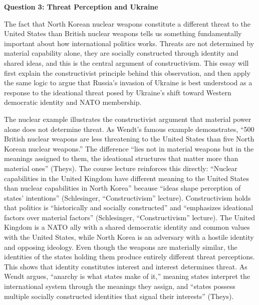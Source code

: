 \documentclass[12pt]{article}
\begin{document}
\newpage
\noindent \textbf{Question 3: Threat Perception and Ukraine}

The fact that North Korean nuclear weapons constitute a different threat to the United States than British nuclear weapons tells us something fundamentally important about how international politics works. Threats are not determined by material capability alone, they are socially constructed through identity and shared ideas, and this is the central argument of constructivism. This essay will first explain the constructivist principle behind this observation, and then apply the same logic to argue that Russia's invasion of Ukraine is best understood as a response to the ideational threat posed by Ukraine's shift toward Western democratic identity and NATO membership.

The nuclear example illustrates the constructivist argument that material power alone does not determine threat. As Wendt's famous example demonstrates, ``500 British nuclear weapons are less threatening to the United States than five North Korean nuclear weapons.'' The difference ``lies not in material weapons but in the meanings assigned to them, the ideational structures that matter more than material ones'' (Theys). The course lecture reinforces this directly: ``Nuclear capabilities in the United Kingdom have different meaning to the United States than nuclear capabilities in North Korea'' because ``ideas shape perception of states' intentions'' (Schlesinger, ``Constructivism'' lecture). Constructivism holds that politics is ``historically and socially constructed'' and ``emphasizes ideational factors over material factors'' (Schlesinger, ``Constructivism'' lecture). The United Kingdom is a NATO ally with a shared democratic identity and common values with the United States, while North Korea is an adversary with a hostile identity and opposing ideology. Even though the weapons are materially similar, the identities of the states holding them produce entirely different threat perceptions. This shows that identity constitutes interest and interest determines threat. As Wendt argues, ``anarchy is what states make of it,'' meaning states interpret the international system through the meanings they assign, and ``states possess multiple socially constructed identities that signal their interests'' (Theys).
\end{document}
